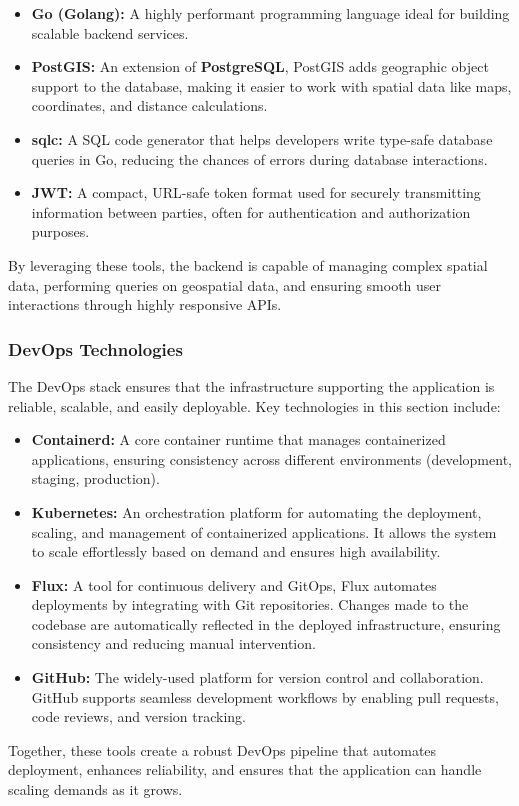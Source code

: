 \begin{itemize}
    \item{} \textbf{Go (Golang):} A highly performant programming language ideal for building scalable backend services.
    \item{} \textbf{PostGIS:}  An extension of \textbf{PostgreSQL}, PostGIS adds geographic object support to the database, making it easier to work with spatial data like maps, coordinates, and distance calculations.
    \item{} \textbf{sqlc:} A SQL code generator that helps developers write type{-}safe database queries in Go, reducing the chances of errors during database interactions.
    \item{} \textbf{JWT:} A compact, URL{-}safe token format used for securely transmitting information between parties, often for authentication and authorization purposes.
\end{itemize}

By leveraging these tools, the backend is capable of managing complex spatial data, performing queries on geospatial data, and ensuring smooth user interactions through highly responsive APIs.

\subsubsection{DevOps Technologies}

The DevOps stack ensures that the infrastructure supporting the application is reliable, scalable, and easily deployable. Key technologies in this section include:

\begin{itemize}
    \item{}  \textbf{Containerd:} A core container runtime that manages containerized applications, ensuring consistency across different environments (development, staging, production).
    \item{} \textbf{Kubernetes:} An orchestration platform for automating the deployment, scaling, and management of containerized applications. It allows the system to scale effortlessly based on demand and ensures high availability.
    \item{} \textbf{Flux:} A tool for continuous delivery and GitOps, Flux automates deployments by integrating with Git repositories. Changes made to the codebase are automatically reflected in the deployed infrastructure, ensuring consistency and reducing manual intervention.
    \item{} \textbf{GitHub:} The widely{-}used platform for version control and collaboration. GitHub supports seamless development workflows by enabling pull requests, code reviews, and version tracking.
\end{itemize}

Together, these tools create a robust DevOps pipeline that automates deployment, enhances reliability, and ensures that the application can handle scaling demands as it grows.
